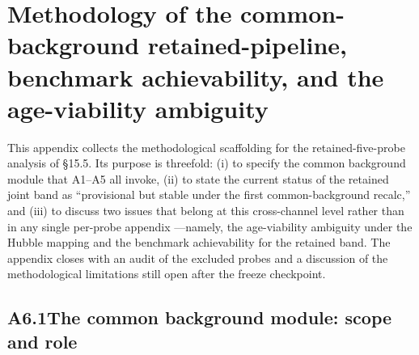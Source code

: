 %
%
%
%
%

\section{Methodology of the common-background retained-pipeline,
benchmark achievability, and the age-viability ambiguity}
\label{app:eps_methodology}

This appendix collects the methodological scaffolding for the
retained-five-probe analysis of \S15.5. Its purpose is threefold:
(i) to specify the common background module that A1--A5 all
invoke, (ii) to state the current status of the retained joint
band as ``provisional but stable under the first common-background
recalc,'' and (iii) to discuss two issues that belong at this
cross-channel level rather than in any single per-probe appendix
---namely, the age-viability ambiguity under the Hubble mapping
and the benchmark achievability for the retained band. The
appendix closes with an audit of the excluded probes and a
discussion of the methodological limitations still open after the
freeze checkpoint.

\subsection*{A6.1\quad The common background module: scope and
role}

